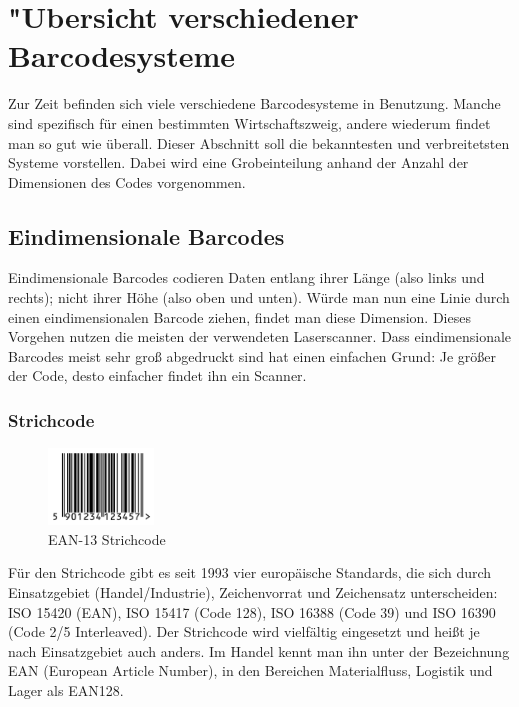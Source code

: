 \section{"Ubersicht verschiedener Barcodesysteme}
Zur Zeit befinden sich viele verschiedene Barcodesysteme in Benutzung. Manche sind spezifisch für einen bestimmten Wirtschaftszweig, andere wiederum findet man so gut wie überall. Dieser Abschnitt soll die bekanntesten und verbreitetsten Systeme vorstellen. Dabei wird eine Grobeinteilung anhand der Anzahl der Dimensionen des Codes vorgenommen.

\subsection{Eindimensionale Barcodes}
Eindimensionale Barcodes codieren Daten entlang ihrer Länge (also links und rechts); nicht ihrer Höhe (also oben und unten). Würde man nun eine Linie durch einen eindimensionalen Barcode ziehen, findet man diese Dimension. Dieses Vorgehen nutzen die meisten der verwendeten Laserscanner. Dass eindimensionale Barcodes meist sehr groß abgedruckt sind hat einen einfachen Grund: Je größer der Code, desto einfacher findet ihn ein Scanner.

\subsubsection{Strichcode}
\begin{figure}
	\centering
	\vspace{-0.2cm}
\includegraphics[width=0.25\textwidth]{Bilder/EAN_13.png}
	\vspace{-0.2cm}
	\caption[EAN-13 Strichcode]{EAN-13 Strichcode\footnotemark}
	\label{barcode}
\end{figure}
Für den Strichcode gibt es seit 1993 vier europäische Standards, die sich durch Einsatzgebiet (Handel/Industrie), Zeichenvorrat und Zeichensatz unterscheiden: ISO 15420 (EAN), ISO 15417 (Code 128), ISO 16388 (Code 39) und ISO 16390 (Code 2/5 Interleaved).
Der Strichcode wird vielfältig eingesetzt und heißt je nach Einsatzgebiet auch anders. Im Handel kennt man ihn unter der Bezeichnung EAN (European Article Number), in den Bereichen Materialfluss, Logistik und Lager als EAN128.

